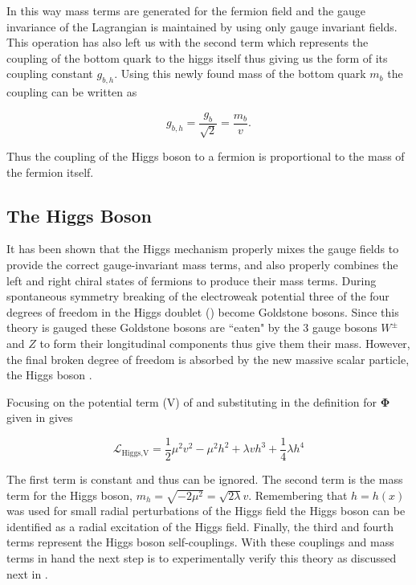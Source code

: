 In this way mass terms are generated for the fermion field and the gauge
invariance of the Lagrangian is maintained by using only gauge invariant
fields.  This operation has also left us with the second term which represents
the coupling of the bottom quark to the higgs itself thus giving us the form of its
coupling constant $g_{b,h}$.  Using this newly found mass of the bottom quark
$m_{b}$ the coupling can be written as

\begin{equation}
g_{b,h} = \frac{g_{b}}{\sqrt{2}} = \frac{m_{b}}{v}.
\end{equation}

Thus the coupling of the Higgs boson to a fermion is proportional
to the mass of the fermion itself. 
 
\subsection{The Higgs Boson}

It has been shown that the Higgs mechanism properly mixes the gauge fields to
provide the correct gauge-invariant mass terms, and also properly combines the
left and right chiral states of fermions to produce their mass terms.  During
spontaneous symmetry breaking of the electroweak potential three of the four
degrees of freedom in the Higgs doublet () become
Goldstone bosons.  Since this theory is gauged these Goldstone bosons are
``eaten" by the 3 gauge bosons $W^{\pm}$ and $Z$ to form their longitudinal
components thus give them their mass.  However, the final broken degree of
freedom is absorbed by the new massive scalar particle, the Higgs boson
\cite{Higgs:1964pj}.

Focusing on the potential term (V) of
 and substituting in the definition for
$\boldsymbol{\Phi}$ given in  gives

\begin{equation}
\mathcal{L}_\text{Higgs,V} = \frac{1}{2} \mu^{2} v^{2} - \mu^{2} h^{2} +
\lambda v h^{3} + \frac{1}{4} \lambda h^{4}
\end{equation}

The first term is constant and thus can be ignored.  The second term is the
mass term for the Higgs boson, $m_h = \sqrt{-2\mu^{2}} = \sqrt{2\lambda}v$.
Remembering that $h = h(x)$ was used for small radial perturbations of the
Higgs field the Higgs boson can be identified as a radial excitation of the
Higgs field.  Finally, the third and fourth terms represent the Higgs boson
self-couplings.  With these couplings and mass terms in hand the next step is
to experimentally verify this theory as discussed next in .
